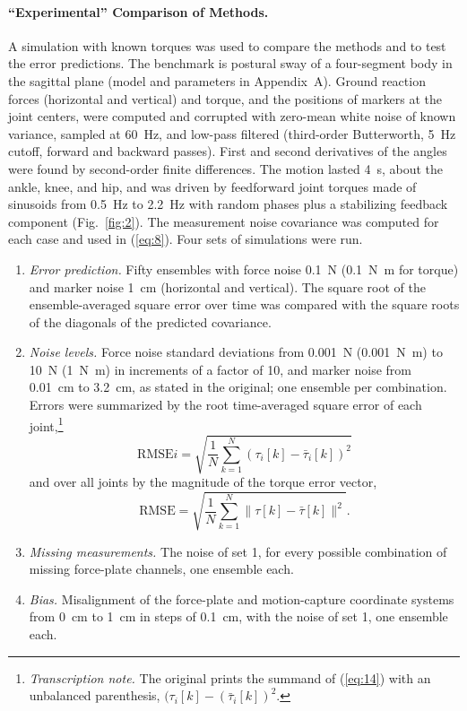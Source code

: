 \documentclass[11pt]{article}
\newcommand{\tnote}[1]{\footnote{\textit{Transcription note.} #1}}
\begin{document}
\paragraph{``Experimental'' Comparison of Methods.} A simulation with known
torques was used to compare the methods and to test the error predictions.
The benchmark is postural sway of a four-segment body in the sagittal plane
(model and parameters in Appendix~A). Ground reaction forces (horizontal and
vertical) and torque, and the positions of markers at the joint centers, were
computed and corrupted with zero-mean white noise of known variance, sampled
at \SI{60}{\hertz}, and low-pass filtered (third-order Butterworth,
\SI{5}{\hertz} cutoff, forward and backward passes). First and second
derivatives of the angles were found by second-order finite differences. The
motion lasted \SI{4}{\second}, about the ankle, knee, and hip, and was driven
by feedforward joint torques made of sinusoids from \SI{0.5}{\hertz} to
\SI{2.2}{\hertz} with random phases plus a stabilizing feedback component
(Fig.~\ref{fig:2}). The measurement noise covariance was computed for each
case and used in (\ref{eq:8}). Four sets of simulations were run.
\begin{enumerate}
\item \emph{Error prediction.} Fifty ensembles with force noise
\SI{0.1}{\newton} (\SI{0.1}{\newton\metre} for torque) and marker noise
\SI{1}{\centi\metre} (horizontal and vertical). The square root of the
ensemble-averaged square error over time was compared with the square roots
of the diagonals of the predicted covariance.
\item \emph{Noise levels.} Force noise standard deviations from
\SI{0.001}{\newton} (\SI{0.001}{\newton\metre}) to \SI{10}{\newton}
(\SI{1}{\newton\metre}) in increments of a factor of 10, and marker noise from
\SI{0.01}{\centi\metre} to \SI{3.2}{\centi\metre}, as stated in the original;
one ensemble per combination. Errors were summarized by the root
time-averaged square error of each joint,\tnote{The original prints the
summand of (\ref{eq:14}) with an unbalanced parenthesis,
$(\tau_i[k]-(\bar{\tau}_i[k])^2$.}
\begin{equation}
\mathrm{RMSE}i = \sqrt{\frac{1}{N}\sum_{k=1}^{N}
(\tau_i[k] - \bar{\tau}_i[k])^2}
\label{eq:14}
\end{equation}
and over all joints by the magnitude of the torque error vector,
\begin{equation}
\mathrm{RMSE} = \sqrt{\frac{1}{N}\sum_{k=1}^{N}\|\tau[k] - \bar{\tau}[k]\|^2}.
\label{eq:15}
\end{equation}
\item \emph{Missing measurements.} The noise of set 1, for every possible
combination of missing force-plate channels, one ensemble each.
\item \emph{Bias.} Misalignment of the force-plate and motion-capture
coordinate systems from \SI{0}{\centi\metre} to \SI{1}{\centi\metre} in steps
of \SI{0.1}{\centi\metre}, with the noise of set 1, one ensemble each.
\end{enumerate}
\end{document}
